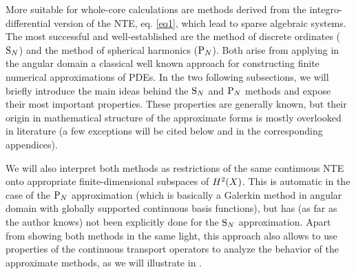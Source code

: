 \vspace*{1em}
More suitable for whole-core calculations are methods derived from the integro-differential
version of the NTE, eq.
\eqref{eq1}, which lead to sparse algebraic systems. The most successful and well-established are the method
of discrete ordinates ($\SN$) and the method of spherical harmonics ($\PN$).
Both arise from applying in the
angular domain a classical well known approach for constructing finite numerical
approximations of PDEs.  In the two following
subsections, we will briefly introduce the main ideas behind the $\SN$ and $\PN$ methods and expose their most
important properties. These properties are generally known, but their origin in mathematical structure of the
approximate forms is mostly overlooked in literature (a few exceptions will be cited below and in the corresponding
appendices). 

We will also interpret both methods as restrictions of the same continuous NTE onto appropriate 
finite-dimensional subspaces of $\Hp[2](X)$. This is automatic in the case of the $\PN$ approximation (which is
basically a Galerkin method in angular domain with globally supported continuous basis functions), but has (as far as
the author knows) not been explicitly done for the $\SN$ approximation. Apart from showing both methods in the same light, this approach also allows to use properties
of the continuous transport operators to analyze the behavior of the approximate methods, as we will illustrate in
.

